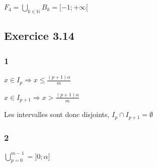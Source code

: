 \documentclass[a4paper,10pt]{report}
\begin{document}
$F_4 = \bigcup_{k \in \mathbb{N}} B_k = [-1 ; +\infty[$


\subsection*{Exercice 3.14}

\subsubsection*{1}

$x \in I_p \Longrightarrow x \leq \frac{(p+1)\alpha}{m}$

$x \in I_{p+1} \Longrightarrow x > \frac{(p+1)\alpha}{m}$

Les intervalles sont donc disjoints, $I_p \cap I_{p+1} = \emptyset$

\subsubsection*{2}
$\bigcup_{p=0}^{m-1} = ]0 ; \alpha]$
\end{document}
